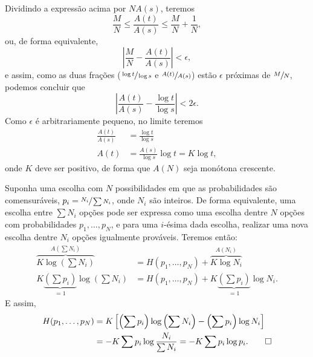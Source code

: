 \begin{interlude}
  Dividindo a expressão acima por $NA(s)$, teremos
  \begin{equation}
  \frac{M}{N} \leq \frac{A(t)}{A(s)} \leq \frac{M}{N} + \frac{1}{N} ,
  \end{equation}
  ou, de forma equivalente,
  \begin{equation}
  \left\vert \frac{M}{N} - \frac{A(t)}{A(s)} \right\vert < \epsilon ,
  \end{equation}
  e assim, como as duas frações ($\sfrac{\log t}{\log s}$ e
  $\sfrac{A(t)}{A(s)}$) estão $\epsilon$ próximas de $\sfrac{M}{N}$,
  podemos concluir que
  \begin{equation}
  \left\vert \frac{A(t)}{A(s)} - \frac{\log t}{\log s} \right\vert < 2\epsilon .
  \end{equation}
  Como $\epsilon$ é arbitrariamente pequeno, no limite teremos
  \begin{subequations}
  \begin{align}
  \frac{A(t)}{A(s)} &= \frac{\log t}{\log s} \\
  A(t) &= \frac{A(s)}{\log s} \log t = K \log t ,
  \end{align}
  \end{subequations}
  onde $K$ deve ser positivo, de forma que $A(N)$ seja monótona crescente.

  Suponha uma escolha com $N$ possibilidades em que as probabilidades são
  comensuráveis, $p_i = \sfrac{N_i}{\sum N_i}$, onde $N_i$ são inteiros. De
  forma equivalente, uma escolha entre $\sum N_i$ opções pode ser expressa como
  uma escolha dentre $N$ opções com probabilidades $p_1, \ldots, p_N$, e para
  uma $i$-ésima dada escolha, realizar uma nova escolha dentre $N_i$ opções
  igualmente prováveis. Teremos então:
  \begin{subequations}
  \begin{align}
  \overbrace{ K \log \left( \sum N_i \right) }^{A\left( \sum N_i \right)} &= H(p_1, \ldots, p_N) + \overbrace{ K \log N_i }^{A(N_i)} \\
  K \underbrace{\left( \sum p_i \right)}_{=1} \log \left( \sum N_i \right) &= H(p_1, \ldots, p_N) + K \underbrace{\left( \sum p_i \right)}_{=1} \log N_i .
  \end{align}
  \end{subequations}
  E assim,
  \begin{subequations}
  \begin{align}
  H(p_1, \ldots, p_N) &= K\left[ \left( \sum p_i \right) \log \left( \sum N_i \right) - \left( \sum p_i \right) \log N_i \right] \\
        &= -K \sum p_i \log \frac{N_i}{\sum N_i} = -K \sum p_i \log p_i . \qed
  \end{align}
  \end{subequations}
  \label{endof:interlude:appendix2}
\end{interlude}

